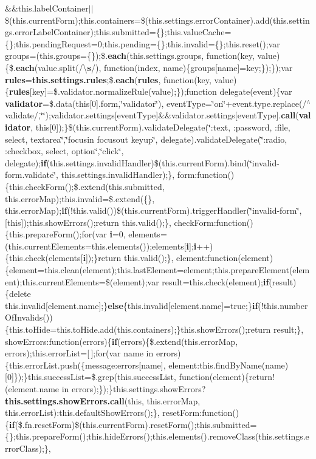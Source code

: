 {\begin{DoxyParamCaption}
\&\&this.\+label\+Container$\vert$$\vert$\$(this.\+current\+Form);this.\+containers=\$(this.\+settings.\+error\+Container).add(this.\+settings.\+error\+Label\+Container);this.\+submitted=\{\};this.\+value\+Cache=\{\};this.\+pending\+Request=0;this.\+pending=\{\};this.\+invalid=\{\};this.\+reset();var groups=(this.\+groups=\{\});\$.{\bf each}(this.\+settings.\+groups, function(key, value)\{\$.{\bf each}(value.\+split(/\textbackslash{}{\bf s}/), function(index, name)\{groups\mbox{[}name\mbox{]}=key;\});\});var {\bf rules}={\bf this.\+settings.\+rules};\$.{\bf each}({\bf rules}, function(key, value)\{{\bf rules}\mbox{[}key\mbox{]}=\$.validator.\+normalize\+Rule(value);\});function delegate(event)\{var {\bf validator}=\$.data(this\mbox{[}0\mbox{]}.form,\char`\"{}validator\char`\"{}), event\+Type=\char`\"{}on\char`\"{}+event.\+type.\+replace(/$^\wedge$validate/,\char`\"{}\char`\"{});validator.\+settings\mbox{[}event\+Type\mbox{]}\&\&validator.\+settings\mbox{[}event\+Type\mbox{]}.{\bf call}({\bf validator}, this\mbox{[}0\mbox{]});\}\$(this.\+current\+Form).validate\+Delegate(\char`\"{}\+:text, \+:password, \+:file, select, textarea\char`\"{},\char`\"{}focusin focusout keyup\char`\"{}, delegate).validate\+Delegate(\char`\"{}\+:radio, \+:checkbox, select, option\char`\"{},\char`\"{}click\char`\"{}, delegate);{\bf if}(this.\+settings.\+invalid\+Handler)\$(this.\+current\+Form).bind(\char`\"{}invalid-\/form.\+validate\char`\"{}, this.\+settings.\+invalid\+Handler);\}, form\+:function()\{this.\+check\+Form();\$.extend(this.\+submitted, this.\+error\+Map);this.\+invalid=\$.extend(\{\}, this.\+error\+Map);{\bf if}(!this.\+valid())\$(this.\+current\+Form).trigger\+Handler(\char`\"{}invalid-\/form\char`\"{}, \mbox{[}this\mbox{]});this.\+show\+Errors();return this.\+valid();\}, check\+Form\+:function()\{this.\+prepare\+Form();for(var {\bf i}=0, elements=(this.\+current\+Elements=this.\+elements());elements\mbox{[}{\bf i}\mbox{]};{\bf i}++)\{this.\+check(elements\mbox{[}{\bf i}\mbox{]});\}return this.\+valid();\}, element\+:function(element)\{element=this.\+clean(element);this.\+last\+Element=element;this.\+prepare\+Element(element);this.\+current\+Elements=\$(element);var result=this.\+check(element);{\bf if}(result)\{delete this.\+invalid\mbox{[}element.\+name\mbox{]};\}{\bf else}\{this.\+invalid\mbox{[}element.\+name\mbox{]}=true;\}{\bf if}(!this.\+number\+Of\+Invalids())\{this.\+to\+Hide=this.\+to\+Hide.\+add(this.\+containers);\}this.\+show\+Errors();return result;\}, show\+Errors\+:function(errors)\{{\bf if}(errors)\{\$.extend(this.\+error\+Map, errors);this.\+error\+List=\mbox{[}$\,$\mbox{]};for(var name in errors)\{this.\+error\+List.\+push(\{message\+:errors\mbox{[}name\mbox{]}, element\+:this.\+find\+By\+Name(name)\mbox{[}0\mbox{]}\});\}this.\+success\+List=\$.grep(this.\+success\+List, function(element)\{return!(element.\+name in errors);\});\}this.\+settings.\+show\+Errors?{\bf this.\+settings.\+show\+Errors.\+call}(this, this.\+error\+Map, this.\+error\+List)\+:this.\+default\+Show\+Errors();\}, reset\+Form\+:function()\{{\bf if}(\$.fn.\+reset\+Form)\$(this.\+current\+Form).reset\+Form();this.\+submitted=\{\};this.\+prepare\+Form();this.\+hide\+Errors();this.\+elements().remove\+Class(this.\+settings.\+error\+Class);\}, 
\end{DoxyParamCaption}}
